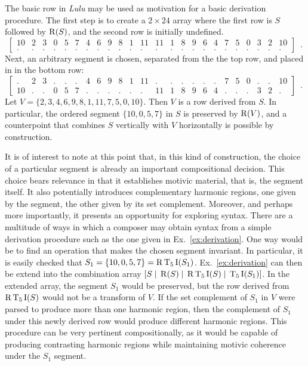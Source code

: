 \begin{example}
	\label{ex:derivation}
	The basic row in \emph{Lulu} may be used as motivation for a basic derivation procedure. The first step is to create a $2 \times 24$ array where the first row is $S$ followed by $\operatorname{R}(S)$, and the second row is initially undefined.
	\begin{equation}
    	\left[
    	\begin{array}{cccccccccccc|cccccccccccc}
        	10 & 2 & 3 & 0 & 5 & 7 & 4 & 6 & 9 & 8 & 1 & 11 & 11 & 1 & 8 & 9 & 6 & 4 & 7 & 5 & 0 & 3 & 2 & 10 \\
        	. & . & . & . & . & . & . & . & . & . & . & . & . & . & . & . & . & . & . & . & . & . & . & .
    	\end{array}
    	\right] \enspace.
	\end{equation}
	Next, an arbitrary segment is chosen, separated from the the top row, and placed in in the bottom row:
	\begin{equation}
    	\left[
    	\begin{array}{cccccccccccc|cccccccccccc}
        	. & 2 & 3 & . & . & . & 4 & 6 & 9 & 8 & 1 & 11 & . & . & . & . & . & . & 7 & 5 & 0 & . & . & 10 \\
        	10 & . & . & 0 & 5 & 7 & . & . & . & . & . & . & 11 & 1 & 8 & 9 & 6 & 4 & . & . & . & 3 & 2 & .
    	\end{array}
    	\right] \enspace.
	\end{equation}
	Let $V = \{ 2, 3, 4, 6, 9, 8, 1, 11, 7, 5, 0, 10 \}$. Then $V$ is a row derived from $S$. In particular, the ordered segment $\{ 10, 0, 5, 7 \}$ in $S$ is preserved by $\operatorname{R}(V)$, and a counterpoint that combines $S$ vertically with $V$ horizontally is possible by construction.
\end{example}

It is of interest to note at this point that, in this kind of construction, the choice of a particular segment is already an important compositional decision. This choice bears relevance in that it establishes motivic material, that is, the segment itself. It also potentially introduces complementary harmonic regions, one given by the segment, the other given by its set complement. Moreover, and perhaps more importantly, it presents an opportunity for exploring syntax. There are a multitude of ways in which a composer may obtain syntax from a simple derivation procedure such as the one given in Ex.~\ref{ex:derivation}. One way would be to find an operation that makes the chosen segment invariant. In particular, it is easily checked that $S_1 = \{ 10, 0, 5, 7 \} = \operatorname{R}\operatorname{T}_5\operatorname{I}(S_1)$. Ex.~\ref{ex:derivation} can then be extend into the combination array $[S \; | \; \operatorname{R}(S) \; | \; \operatorname{R}\operatorname{T}_5\operatorname{I}(S) \; | \; \operatorname{T}_5\operatorname{I}(S_1)]$. In the extended array, the segment $S_1$ would be preserved, but the row derived from $\operatorname{R}\operatorname{T}_5\operatorname{I}(S)$ would not be a transform of $V$. If the set complement of $S_1$ in $V$ were parsed to produce more than one harmonic region, then the complement of $S_1$ under this newly derived row would produce different harmonic regions. This procedure can be very pertinent compositionally, as it would be capable of producing contrasting harmonic regions while maintaining motivic coherence under the $S_1$ segment.

